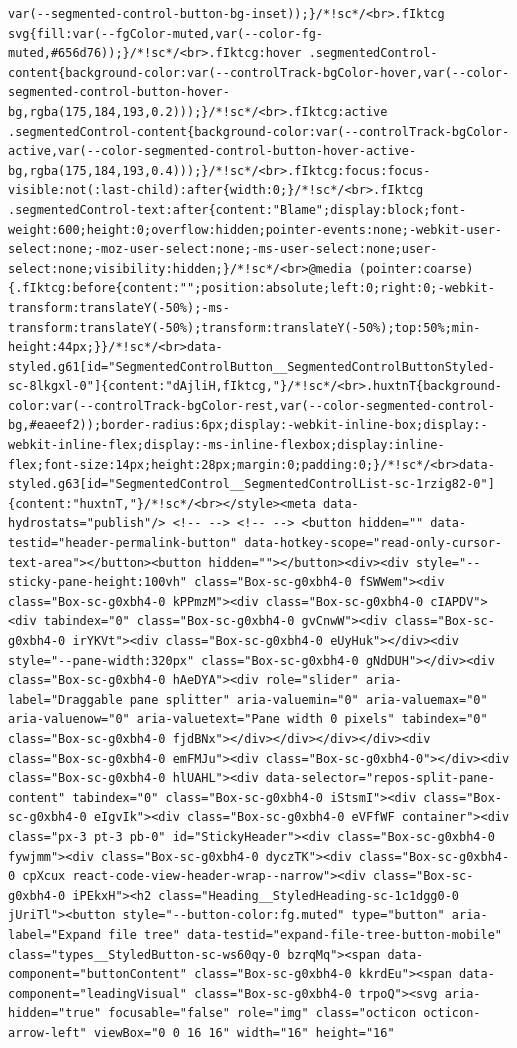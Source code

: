 \documentclass[
  letterpaper,
]{book}
\begin{document}
\begin{verbatim}
var(--segmented-control-button-bg-inset));}/*!sc*/<br>.fIktcg svg{fill:var(--fgColor-muted,var(--color-fg-muted,#656d76));}/*!sc*/<br>.fIktcg:hover .segmentedControl-content{background-color:var(--controlTrack-bgColor-hover,var(--color-segmented-control-button-hover-bg,rgba(175,184,193,0.2)));}/*!sc*/<br>.fIktcg:active .segmentedControl-content{background-color:var(--controlTrack-bgColor-active,var(--color-segmented-control-button-hover-active-bg,rgba(175,184,193,0.4)));}/*!sc*/<br>.fIktcg:focus:focus-visible:not(:last-child):after{width:0;}/*!sc*/<br>.fIktcg .segmentedControl-text:after{content:"Blame";display:block;font-weight:600;height:0;overflow:hidden;pointer-events:none;-webkit-user-select:none;-moz-user-select:none;-ms-user-select:none;user-select:none;visibility:hidden;}/*!sc*/<br>@media (pointer:coarse){.fIktcg:before{content:"";position:absolute;left:0;right:0;-webkit-transform:translateY(-50%);-ms-transform:translateY(-50%);transform:translateY(-50%);top:50%;min-height:44px;}}/*!sc*/<br>data-styled.g61[id="SegmentedControlButton__SegmentedControlButtonStyled-sc-8lkgxl-0"]{content:"dAjliH,fIktcg,"}/*!sc*/<br>.huxtnT{background-color:var(--controlTrack-bgColor-rest,var(--color-segmented-control-bg,#eaeef2));border-radius:6px;display:-webkit-inline-box;display:-webkit-inline-flex;display:-ms-inline-flexbox;display:inline-flex;font-size:14px;height:28px;margin:0;padding:0;}/*!sc*/<br>data-styled.g63[id="SegmentedControl__SegmentedControlList-sc-1rzig82-0"]{content:"huxtnT,"}/*!sc*/<br></style><meta data-hydrostats="publish"/> <!-- --> <!-- --> <button hidden="" data-testid="header-permalink-button" data-hotkey-scope="read-only-cursor-text-area"></button><button hidden=""></button><div><div style="--sticky-pane-height:100vh" class="Box-sc-g0xbh4-0 fSWWem"><div class="Box-sc-g0xbh4-0 kPPmzM"><div class="Box-sc-g0xbh4-0 cIAPDV"><div tabindex="0" class="Box-sc-g0xbh4-0 gvCnwW"><div class="Box-sc-g0xbh4-0 irYKVt"><div class="Box-sc-g0xbh4-0 eUyHuk"></div><div style="--pane-width:320px" class="Box-sc-g0xbh4-0 gNdDUH"></div><div class="Box-sc-g0xbh4-0 hAeDYA"><div role="slider" aria-label="Draggable pane splitter" aria-valuemin="0" aria-valuemax="0" aria-valuenow="0" aria-valuetext="Pane width 0 pixels" tabindex="0" class="Box-sc-g0xbh4-0 fjdBNx"></div></div></div></div><div class="Box-sc-g0xbh4-0 emFMJu"><div class="Box-sc-g0xbh4-0"></div><div class="Box-sc-g0xbh4-0 hlUAHL"><div data-selector="repos-split-pane-content" tabindex="0" class="Box-sc-g0xbh4-0 iStsmI"><div class="Box-sc-g0xbh4-0 eIgvIk"><div class="Box-sc-g0xbh4-0 eVFfWF container"><div class="px-3 pt-3 pb-0" id="StickyHeader"><div class="Box-sc-g0xbh4-0 fywjmm"><div class="Box-sc-g0xbh4-0 dyczTK"><div class="Box-sc-g0xbh4-0 cpXcux react-code-view-header-wrap--narrow"><div class="Box-sc-g0xbh4-0 iPEkxH"><h2 class="Heading__StyledHeading-sc-1c1dgg0-0 jUriTl"><button style="--button-color:fg.muted" type="button" aria-label="Expand file tree" data-testid="expand-file-tree-button-mobile" class="types__StyledButton-sc-ws60qy-0 bzrqMq"><span data-component="buttonContent" class="Box-sc-g0xbh4-0 kkrdEu"><span data-component="leadingVisual" class="Box-sc-g0xbh4-0 trpoQ"><svg aria-hidden="true" focusable="false" role="img" class="octicon octicon-arrow-left" viewBox="0 0 16 16" width="16" height="16" 
\end{verbatim}
\end{document}
